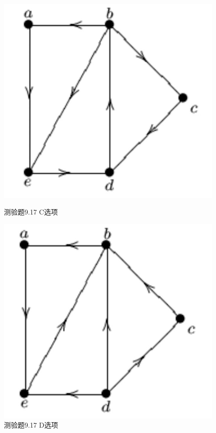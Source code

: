 \documentclass[UTF8, heading=true]{ctexart}
\begin{document}
\begin{figure}[H]
  \centering
  \begin{minipage}[t]{0.25\textwidth}
      \centering
      \includegraphics[width=1\textwidth]{9.17_3.jpg} %
      \vspace{-0.3cm}
      \caption{测验题9.17 C选项}
  \end{minipage}
  \hspace{0.2\textwidth} %
  \begin{minipage}[t]{0.25\textwidth}
      \centering
      \includegraphics[width=1\textwidth]{9.17_4.jpg} %
      \vspace{-0.3cm}
      \caption{测验题9.17 D选项}
\end{minipage}
\end{figure}
\end{document}
